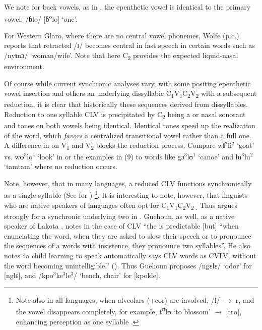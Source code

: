 \documentclass[output=paper
,newtxmath
,modfonts
,nonflat]{langsci/langscibook}
\begin{document}
We note for back vowels, as in , the epenthetic vowel is identical to the primary vowel: /ɓlo/ [ɓ\textsuperscript{o}lo] ‘one’.  

For Western Glaro, where there are no central vowel phonemes, Wolfe (p.c.) reports that retracted /ɪ/ becomes central in fast speech in certain words such as /ny\textbf{ɩ}nɔ/ ‘woman/wife’. Note that here C\textsubscript{2} provides the expected liquid-nasal environment. 

Of course while current synchronic analyses vary, with some positing epenthetic vowel insertion and others an underlying dissyllabic C\textsubscript{1}V\textsubscript{1}C\textsubscript{2}V\textsubscript{2} with a subsequent reduction, it is clear that historically these sequences derived from dissyllables. Reduction to one syllable CLV is precipitated by C\textsubscript{2} being a  or nasal sonorant and tones on both vowels being identical. Identical tones speed up the realization of the word, which \textit{favors} a centralized transitional vowel rather than a full one.  A difference in  on V\textsubscript{1} and V\textsubscript{2} blocks the reduction process.  Compare w\textbf{ɨ$^2$}li$^2$ ‘goat’ vs. w\textbf{o$^3$}lo$^4$ ‘look’ in  \citep[20, 31]{Seri1987} or the  examples in (9) to words like gɔ$^3$lʊ$^1$ ‘canoe’ and lu$^3$lu$^2$ ‘tamtam’ where no reduction occurs.   

Note, however, that in many languages, a reduced CLV functions synchronically as a single syllable (See \citealt{Gratrix1975} for ){} \footnote{Note also in all  languages, when alveolars (+cor) are involved, /l/ $\rightarrow$ r, and the vowel disappears completely, for example,  t\textsuperscript{ʊ}lʊ ‘to blossom’ $\rightarrow$ [trʊ], enhancing perception as one syllable \citep{Marchese1979/1983}.}.  It is interesting to note, however, that linguists who are native speakers of  languages often opt for C\textsubscript{1}V\textsubscript{1}C\textsubscript{2}V\textsubscript{2 .}  Thus \citet{Kipre2015} argues strongly for a synchronic underlying two  in  . Guehoun, as well, as a native speaker of Lakota , notes in the case of CLV “the  is predictable [but] “when enunciating the word, when they are asked to slow their speech or to pronounce the sequences of a words with insistence, they pronounce two syllables”. He also notes “a child learning to speak automatically says CLV words as CVLV, without the word becoming unintelligible.” (\citeyear[55-56]{Guehoun1993}). Thus Guehoun proposes /ngɛlɛ/ ‘odor’ for [nglɛ], and /kpo$^3$ke$^3$le$^3$/ ‘bench, chair’ for [kpokle].  
\end{document}
